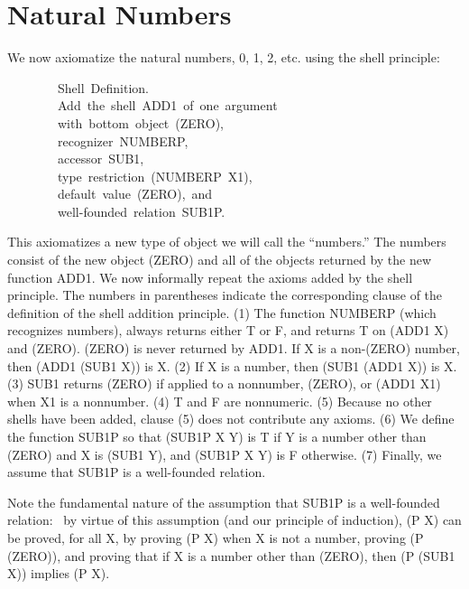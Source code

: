 \documentclass[11pt]{book}
\newenvironment{pubasis}{\begin{flushleft}\ttfamily\small}{\normalsize\rmfamily\end{flushleft}}
\newcommand{\pubdefaulttextsize}{\large}
\begin{document}
\section{Natural Numbers}
\pubdefaulttextsize
We now axiomatize the natural numbers, 0, 1, 2, etc.  using
the shell principle:
\par\pagebreak[0]\hrulefill\nopagebreak\par
\begin{pubasis}
~~~~~~~~Shell~Definition.\\
~~~~~~~~Add~the~shell~ADD1~of~one~argument~\\
~~~~~~~~with~bottom~object~(ZERO),\\
~~~~~~~~recognizer~NUMBERP,\\
~~~~~~~~accessor~SUB1,\\
~~~~~~~~type~restriction~(NUMBERP~X1),\\
~~~~~~~~default~value~(ZERO),~and\\
~~~~~~~~well-founded~relation~SUB1P.\\
\end{pubasis}
\nopagebreak\par\hrulefill\nopagebreak\par
This  axiomatizes 
a new type of object we will call the ``numbers.''
The numbers consist of the new object (ZERO) and all of the
objects returned by the new function ADD1.
We now informally repeat the axioms added by the shell principle.
The numbers in parentheses indicate the corresponding clause
of the definition of the shell addition principle.
(1) The function NUMBERP
(which recognizes numbers), always returns either T or F, and returns T on 
(ADD1 X) and (ZERO).  (ZERO) is never
returned by ADD1.  If X is a non-(ZERO) number, then (ADD1 (SUB1 X))
is X.  (2) If X is a number, then (SUB1 (ADD1 X)) is X.  (3) SUB1 returns (ZERO)
if applied to a nonnumber, (ZERO), or (ADD1 X1) when X1 is a nonnumber.
(4) T and F are nonnumeric.  (5) Because no other shells have been
added, clause (5) does not contribute any axioms.
(6) We define the function SUB1P so that (SUB1P X Y) is T if
Y is a number other than (ZERO) and X is  (SUB1 Y), and (SUB1P X Y)
is F otherwise.  (7) Finally, we assume that SUB1P is a well-founded relation.

Note the fundamental nature of the assumption that SUB1P is a well-founded relation:~
by virtue of this assumption (and our principle of
induction), (P X) can be proved, for all X, by proving (P X)
when X is not a number, proving (P (ZERO)), and proving that if X is
a number other than (ZERO), then (P (SUB1 X)) implies (P X).
\end{document}
